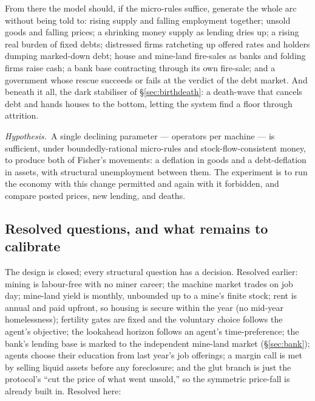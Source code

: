 \documentclass[11pt]{article}
\newcommand{\hyp}[1]{\medskip\noindent\textit{Hypothesis.}\ #1\medskip}
\begin{document}
From there the model should, if the micro-rules suffice, generate the whole
arc without being told to: rising supply and falling employment together;
unsold goods and falling prices; a shrinking money supply as lending dries up;
a rising real burden of fixed debts; distressed firms ratcheting up offered
rates and holders dumping marked-down debt; house and mine-land fire-sales as
banks and folding firms raise cash; a bank base contracting through its own
fire-sale; and a government whose rescue succeeds or fails at the verdict of the
debt market. And beneath it all, the dark stabiliser of
\S\ref{sec:birthdeath}: a death-wave that cancels debt and hands houses to the
bottom, letting the system find a floor through attrition.

\hyp A single declining parameter --- operators per machine --- is sufficient,
under boundedly-rational micro-rules and stock-flow-consistent money, to produce
both of Fisher's movements: a deflation in goods and a debt-deflation in assets,
with structural unemployment between them. The experiment is to run the economy
with this change permitted and again with it forbidden, and compare posted
prices, new lending, and deaths.

\subsection{Resolved questions, and what remains to calibrate}
\label{sec:open}

The design is closed; every structural question has a decision. Resolved earlier:
mining is labour-free with no miner career; the machine market trades on job day;
mine-land yield is monthly, unbounded up to a mine's finite stock; rent is annual
and paid upfront, so housing is secure within the year (no mid-year
homelessness); fertility gates are fixed and the voluntary choice follows the
agent's objective; the lookahead horizon follows an agent's time-preference; the
bank's lending base is marked to the independent mine-land market
(\S\ref{sec:bank}); agents choose their education from last year's job offerings;
a margin call is met by selling liquid assets before any foreclosure; and the
glut branch is just the protocol's ``cut the price of what went unsold,'' so the
symmetric price-fall is already built in. Resolved here:
\end{document}
